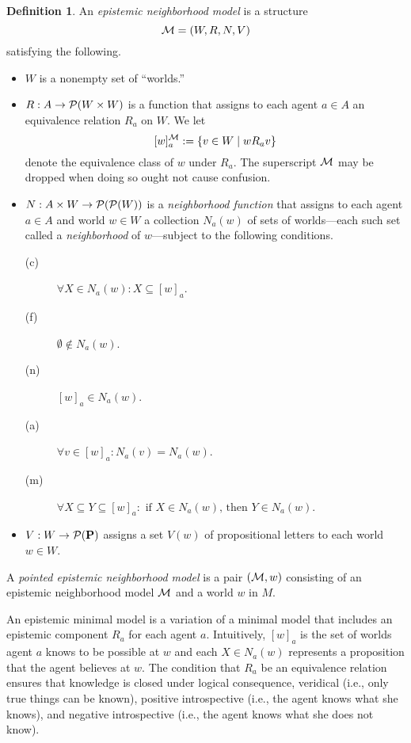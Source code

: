 \documentclass[12pt]{article}
\theoremstyle{definition}
\newtheorem{definition}[theorem]{Definition}
\newcommand{\pow}{{\cal P}}    %
\newcommand{\M}{{\cal M}}      %
\newcommand{\Prop}{{\bf P}}    %
\begin{document}
\begin{definition} 
  An \emph{epistemic neighborhood model} is a structure
  \[
  \M=(W,R,N,V)
  \]
  satisfying the following.
  \begin{itemize}
  \item $W$ is a nonempty set of ``worlds.''

  \item $R : A \to \pow (W \times W)$ is a function that assigns to each
    agent $a\in A$ an equivalence relation $R_a$ on $W$.  We let
    \[
    [w]^\M_a:=\{v\in W\mid wR_av\}
    \]
    denote the equivalence class of $w$ under $R_a$.  The superscript
    $\M$ may be dropped when doing so ought not cause confusion.

  \item $N : A\times W \to \pow(\pow(W))$ is a \emph{neighborhood
      function} that assigns to each agent $a\in A$ and world $w\in W$
    a collection $N_a(w)$ of sets of worlds---each such set called a
    \emph{neighborhood} of $w$---subject to the following conditions.
    \begin{description}
    \item[(c)] $\forall X \in N_a(w) : X \subseteq [w]_a$.

    \item[(f)] $\emptyset\notin N_a(w)$.
      
    \item[(n)] $[w]_a\in N_a(w)$.
      
    \item[(a)] $\forall v \in [w]_a : N_a(v) = N_a(w)$.

    \item[(m)] $\forall X \subseteq Y \subseteq [w]_a : 
      \text{ if } X \in N_a(w) \text{, then } Y \in N_a(w)$.
    \end{description}

  \item $V:W\to\pow(\Prop)$ assigns a set $V(w)$ of propositional
    letters to each world $w\in W$.
  \end{itemize}
  A \emph{pointed epistemic neighborhood model} is a pair $(\M,w)$
  consisting of an epistemic neighborhood model $\M$ and a world $w$
  in $M$.
\end{definition} 

An epistemic minimal model is a variation of a minimal model that
includes an epistemic component $R_a$ for each agent $a$.
Intuitively, $[w]_a$ is the set of worlds agent $a$ knows to be
possible at $w$ and each $X\in N_a(w)$ represents a proposition that
the agent believes at $w$.  The condition that $R_a$ be an equivalence
relation ensures that knowledge is closed under logical consequence,
veridical (i.e., only true things can be known), positive
introspective (i.e., the agent knows what she knows), and negative
introspective (i.e., the agent knows what she does not know).
\end{document}
